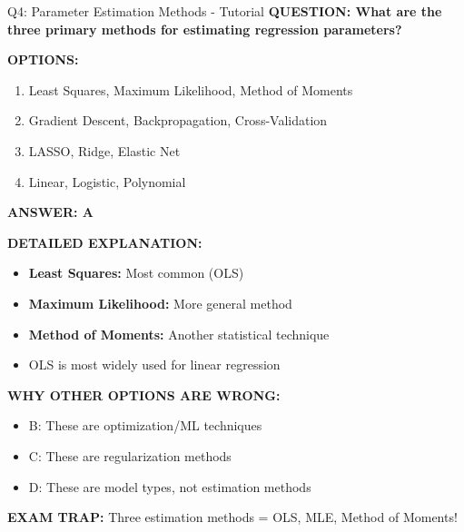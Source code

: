 \documentclass[8pt]{beamer}
\begin{document}
	\begin{frame}{Q4: Parameter Estimation Methods - Tutorial}
		\fontsize{6.5}{7.5}\selectfont
		\textbf{QUESTION: What are the three primary methods for estimating regression parameters?}
		
		\vspace{0.1cm}
		\textbf{OPTIONS:}
		\begin{enumerate}
			\item Least Squares, Maximum Likelihood, Method of Moments
			\item Gradient Descent, Backpropagation, Cross-Validation
			\item LASSO, Ridge, Elastic Net
			\item Linear, Logistic, Polynomial
		\end{enumerate}
		
		\vspace{0.1cm}
		\textcolor{myblue}{\textbf{ANSWER: A}}
		
		\vspace{0.1cm}
		\textbf{DETAILED EXPLANATION:}
		\begin{itemize}
			\item \textbf{Least Squares:} Most common (OLS)
			\item \textbf{Maximum Likelihood:} More general method
			\item \textbf{Method of Moments:} Another statistical technique
			\item OLS is most widely used for linear regression
		\end{itemize}
		
		\vspace{0.1cm}
		\textcolor{myred}{\textbf{WHY OTHER OPTIONS ARE WRONG:}}
		\begin{itemize}
			\item \textcolor{myred}{B:} These are optimization/ML techniques
			\item \textcolor{myred}{C:} These are regularization methods
			\item \textcolor{myred}{D:} These are model types, not estimation methods
		\end{itemize}
		
		\textcolor{myred}{\textbf{EXAM TRAP:}} Three estimation methods = \textcolor{myblue}{OLS, MLE, Method of Moments}!
	\end{frame}
	
\end{document}

